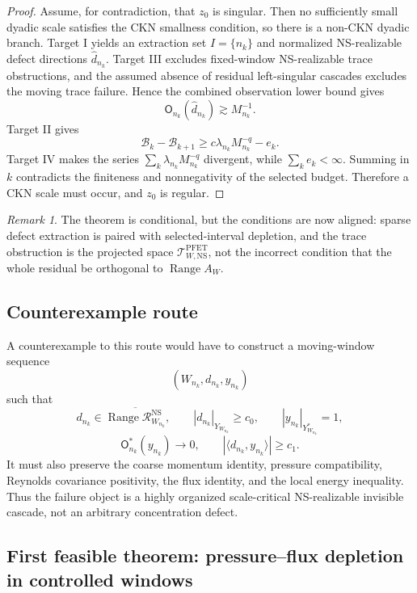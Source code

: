 \documentclass[11pt]{article}
\numberwithin{equation}{section}
\theoremstyle{plain}
\theoremstyle{definition}
\theoremstyle{remark}
\newtheorem{remark}[theorem]{Remark}
\newcommand{\NS}{\mathrm{NS}}
\newcommand{\PFET}{\mathrm{PFET}}
\begin{document}
\begin{proof}
Assume, for contradiction, that \(z_0\) is singular.  Then no sufficiently small
dyadic scale satisfies the CKN smallness condition, so there is a non-CKN dyadic
branch.  Target I yields an extraction set \(I=\{n_k\}\) and normalized
NS-realizable defect directions \(\widehat d_{n_k}\).  Target III excludes
fixed-window NS-realizable trace obstructions, and the assumed absence of
residual left-singular cascades excludes the moving trace failure.  Hence the
combined observation lower bound gives
\[
        \mathsf O_{n_k}(\widehat d_{n_k})\gtrsim M_{n_k}^{-1}.
\]
Target II gives
\[
        \mathscr B_k-\mathscr B_{k+1}
        \ge
        c\lambda_{n_k}M_{n_k}^{-q}-e_k.
\]
Target IV makes the series \(\sum_k\lambda_{n_k}M_{n_k}^{-q}\) divergent, while
\(\sum_k e_k<\infty\).  Summing in \(k\) contradicts the finiteness and
nonnegativity of the selected budget.  Therefore a CKN scale must occur, and
\(z_0\) is regular.
\end{proof}

\begin{remark}
The theorem is conditional, but the conditions are now aligned: sparse defect
extraction is paired with selected-interval depletion, and the trace obstruction
is the projected space \(\mathcal T_{W,\NS}^{\PFET}\), not the incorrect
condition that the whole residual be orthogonal to \(\operatorname{Range}A_W\).
\end{remark}

\subsection{Counterexample route}

A counterexample to this route would have to construct a moving-window sequence
\[
        (W_{n_k},d_{n_k},y_{n_k})
\]
such that
\[
        d_{n_k}\in \overline{\operatorname{Range}\mathcal R^{\NS}_{W_{n_k}}},
        \qquad
        |d_{n_k}|_{Y_{W_{n_k}}}\ge c_0,
        \qquad
        |y_{n_k}|_{Y_{W_{n_k}}^*}=1,
\]
\[
        \mathsf O_{n_k}^*(y_{n_k})\to0,
        \qquad
        |\langle d_{n_k},y_{n_k}\rangle|\ge c_1.
\]
It must also preserve the coarse momentum identity, pressure compatibility,
Reynolds covariance positivity, the flux identity, and the local energy
inequality.  Thus the failure object is a highly organized scale-critical
NS-realizable invisible cascade, not an arbitrary concentration defect.

\subsection{First feasible theorem: pressure--flux depletion in controlled windows}
\end{document}
